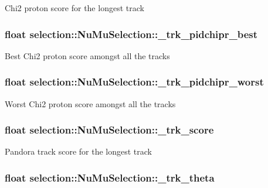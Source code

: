 Chi2 proton score for the longest track \hypertarget{classselection_1_1NuMuSelection_ad0b2f58434040e2c9e9304a93252d5e1}{
\subsubsection[{\-\_\-trk\-\_\-pidchipr\-\_\-best}]{\setlength{\rightskip}{0pt plus 5cm}float selection\-::\-Nu\-Mu\-Selection\-::\-\_\-trk\-\_\-pidchipr\-\_\-best\hspace{0.3cm}{\ttfamily [private]}}}\label{classselection_1_1NuMuSelection_ad0b2f58434040e2c9e9304a93252d5e1}
Best Chi2 proton score amongst all the tracks \hypertarget{classselection_1_1NuMuSelection_a0373f32c36b713af9febf4e5e3b6899a}{
\subsubsection[{\-\_\-trk\-\_\-pidchipr\-\_\-worst}]{\setlength{\rightskip}{0pt plus 5cm}float selection\-::\-Nu\-Mu\-Selection\-::\-\_\-trk\-\_\-pidchipr\-\_\-worst\hspace{0.3cm}{\ttfamily [private]}}}\label{classselection_1_1NuMuSelection_a0373f32c36b713af9febf4e5e3b6899a}
Worst Chi2 proton score amongst all the tracks \hypertarget{classselection_1_1NuMuSelection_a2316596a59c6b87ea5aa75716c588117}{
\subsubsection[{\-\_\-trk\-\_\-score}]{\setlength{\rightskip}{0pt plus 5cm}float selection\-::\-Nu\-Mu\-Selection\-::\-\_\-trk\-\_\-score\hspace{0.3cm}{\ttfamily [private]}}}\label{classselection_1_1NuMuSelection_a2316596a59c6b87ea5aa75716c588117}
Pandora track score for the longest track \hypertarget{classselection_1_1NuMuSelection_a2041fd7980c1dbe98ce5a4c77a305167}{
\subsubsection[{\-\_\-trk\-\_\-theta}]{\setlength{\rightskip}{0pt plus 5cm}float selection\-::\-Nu\-Mu\-Selection\-::\-\_\-trk\-\_\-theta\hspace{0.3cm}{\ttfamily [private]}}}\label{classselection_1_1NuMuSelection_a2041fd7980c1dbe98ce5a4c77a305167}
